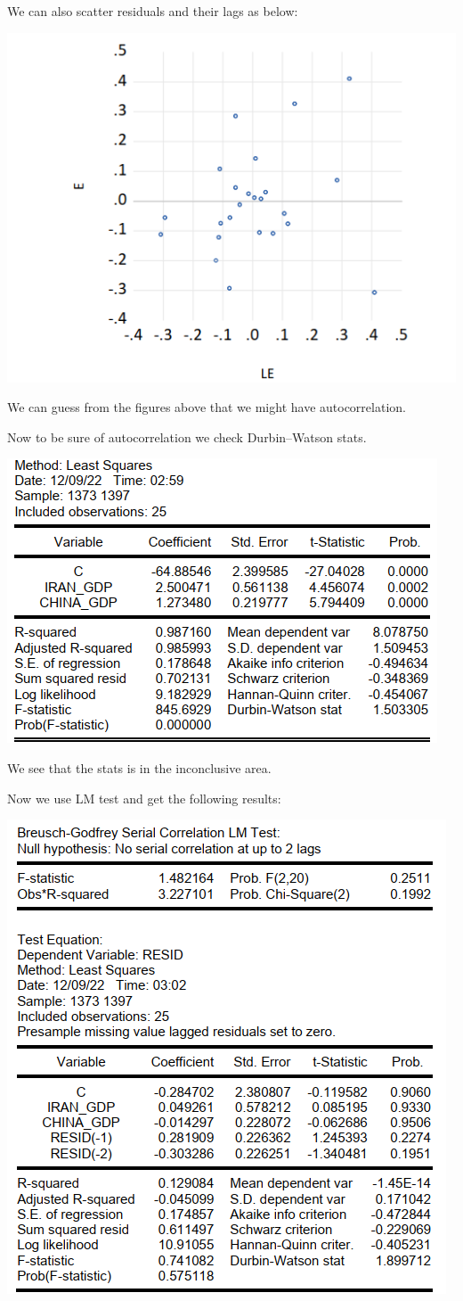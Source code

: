 \documentclass[12pt, letterpaper, twoside]{article}
\begin{document}
We can also scatter residuals and their lags as below:

        \includegraphics[width=.6\textwidth,height=.6\textwidth,keepaspectratio,center]{17.png}
        
We can guess from the figures above that we might have autocorrelation.

Now to be sure of autocorrelation we check Durbin–Watson stats.

        \includegraphics[width=.6\textwidth,height=.6\textwidth,keepaspectratio,center]{18.png}
        
We see that the stats is in the inconclusive area.

Now we use LM test and get the following results:

        \includegraphics[width=.6\textwidth,height=.6\textwidth,keepaspectratio,center]{19.png}
\end{document}
